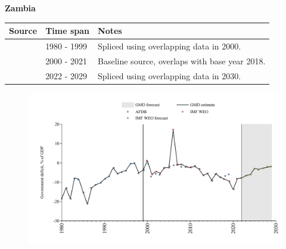 \documentclass[12pt,a4paper,landscape]{article}
\begin{document}
\begin{adjustbox}{max totalsize={\paperwidth}{\paperheight},center}
\begin{minipage}[t][\textheight][t]{\textwidth}
\vspace*{0.5cm}
{}
\begin{center}
{\Large\bfseries Zambia}
\end{center}
\vspace{0.5cm}
\begin{table}[H]
\centering
\small
\begin{tabular}{|l|l|l|}
\hline
\textbf{Source} & \textbf{Time span} & \textbf{Notes} \\
\hline
\rowcolor{white}\cite{AFDB}& 1980 - 1999 &Spliced using overlapping data in 2000.\\
\rowcolor{lightgray}\cite{IMF_WEO}& 2000 - 2021 &Baseline source, overlaps with base year 2018.\\
\rowcolor{white}\cite{IMF_WEO_forecast}& 2022 - 2029 &Spliced using overlapping data in 2030.\\
\hline
\end{tabular}
\end{table}
\begin{figure}[H]
\centering
\includegraphics[width=\textwidth,height=0.6\textheight,keepaspectratio]{graphs/ZMB_govdef_GDP.pdf}
\end{figure}
\end{minipage}
\end{adjustbox}
\end{document}
